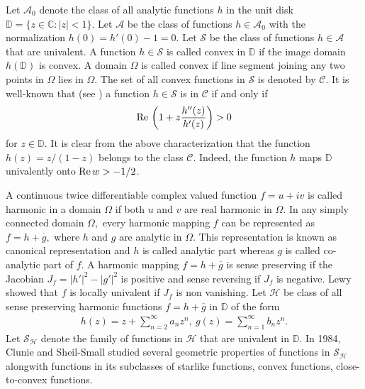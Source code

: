 \documentclass[a4paper,12pt]{amsart}
\theoremstyle{definition}
\newcounter {own}
\begin{document}
	Let $\mathcal{A}_0$ denote the class of all analytic functions $h$ in the unit disk $\mathbb{D}=\{z\in\mathbb{C}:|z|<1\}.$
	Let $\mathcal{A}$ be the class of functions $h\in\mathcal{A}_0$ with the normalization $h(0)=h'(0)-1=0.$ Let $\mathcal{S}$ be the class of functions $h\in\mathcal{A}$ that are univalent. A function $h\in\mathcal{S}$ is called convex in $\mathbb{D}$ if the image domain $h(\mathbb{D})$ is convex. A domain $\Omega$ is called convex if line segment joining any two points in $\Omega$ lies in $\Omega.$ The set of all convex functions in $\mathcal{S}$ is denoted by $\mathcal{C}$. It is well-known that (see \cite{Duren-1983}) a function $h\in\mathcal{S}$ is in $\mathcal{C}$ if and only if
	\begin{align*}
		{\rm Re\,}\left(1+z\frac{h''(z)}{h'(z)}\right)>0
	\end{align*}
	for $z\in\mathbb{D}.$ It is clear from the above characterization that the function $h(z)=z/(1-z)$ belongs to the class $\mathcal{C}.$ Indeed, the function $h$ maps $\mathbb{D}$ univalently onto ${\rm Re\,}w >-1/2$.
	
 A continuous twice differentiable complex valued function $f=u+iv$ is called harmonic in a domain $\Omega$ if both $u$ and $v$ are real harmonic in $\Omega.$ In any simply connected domain $\Omega,$ every harmonic mapping $f$ can be represented as $f=h+\overline{g},$ where $h$ and $g$ are analytic in $\Omega.$ This representation is known as canonical representation and $h$ is called analytic part whereas $g$ is called co-analytic part of $f.$ A harmonic mapping $f=h+\overline{g}$ is sense preserving if the Jacobian $J_f=|h'|^2-|g'|^2$ is positive and sense reversing if $J_f$ is negative. Lewy \cite{Lewy-1936} showed that $f$ is locally univalent if $J_f$ is non vanishing. Let $\mathcal{H}$ be class of all sense preserving harmonic functions $f=h+\overline{g}$ in $\mathbb{D}$ of the form
    \begin{align}\label{P-151}
		h(z)=z+\sum\limits_{n=2}^\infty a_nz^n,~g(z)=\sum\limits_{n=1}^\infty b_nz^n.
	\end{align}
	Let $\mathcal{S_H}$ denote the family of functions in $\mathcal{H}$ that are univalent in $\mathbb{D}$. In 1984, Clunie and Sheil-Small \cite{Clunie-Small-1984} studied several geometric properties of functions in $\mathcal{S_H}$ alongwith functions in its  subclasses of starlike functions, convex functions, close-to-convex functions.
	
	
	
	
	
\end{document}
